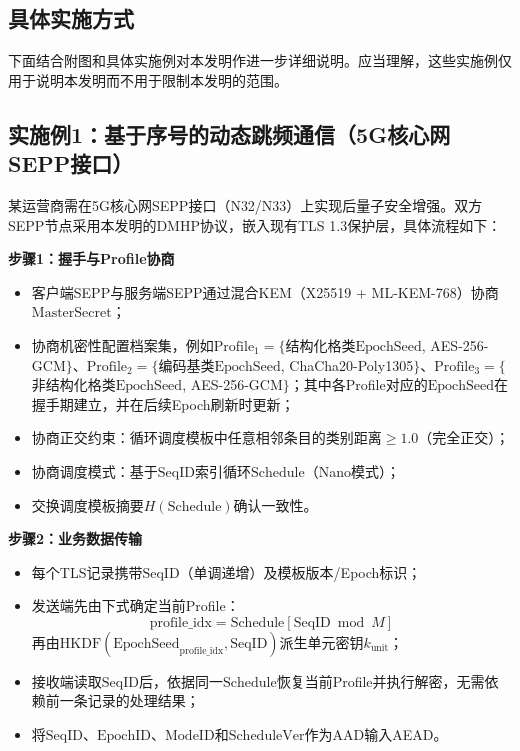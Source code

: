 ﻿\documentclass[12pt,a4paper]{article}
\begin{document}
\subsection*{具体实施方式}

下面结合附图和具体实施例对本发明作进一步详细说明。应当理解，这些实施例仅用于说明本发明而不用于限制本发明的范围。

\subsection*{实施例1：基于序号的动态跳频通信（5G核心网SEPP接口）}

某运营商需在5G核心网SEPP接口（N32/N33）上实现后量子安全增强。双方SEPP节点采用本发明的DMHP协议，嵌入现有TLS 1.3保护层，具体流程如下：

\textbf{步骤1：握手与Profile协商}

\begin{itemize}
    \item 客户端SEPP与服务端SEPP通过混合KEM（X25519 + ML-KEM-768）协商$\text{MasterSecret}$；
    \item 协商机密性配置档案集，例如$\text{Profile}_1=\{$结构化格类$\text{EpochSeed}$, AES-256-GCM$\}$、$\text{Profile}_2=\{$编码基类$\text{EpochSeed}$, ChaCha20-Poly1305$\}$、$\text{Profile}_3=\{$非结构化格类$\text{EpochSeed}$, AES-256-GCM$\}$；其中各Profile对应的$\text{EpochSeed}$在握手期建立，并在后续Epoch刷新时更新；
    \item 协商正交约束：循环调度模板中任意相邻条目的类别距离$\geq 1.0$（完全正交）；
    \item 协商调度模式：基于$\text{SeqID}$索引循环$\text{Schedule}$（Nano模式）；
    \item 交换调度模板摘要$H(\text{Schedule})$确认一致性。
\end{itemize}

\textbf{步骤2：业务数据传输}

\begin{itemize}
    \item 每个TLS记录携带$\text{SeqID}$（单调递增）及模板版本/Epoch标识；
    \item 发送端先由下式确定当前Profile：
    \[
    \text{profile\_idx}=\text{Schedule}[\text{SeqID} \bmod M]
    \]
    再由$\text{HKDF}(\text{EpochSeed}_{\text{profile\_idx}}, \text{SeqID})$派生单元密钥$k_{\text{unit}}$；
    \item 接收端读取$\text{SeqID}$后，依据同一$\text{Schedule}$恢复当前Profile并执行解密，无需依赖前一条记录的处理结果；
    \item 将$\text{SeqID}$、$\text{EpochID}$、$\text{ModeID}$和$\text{ScheduleVer}$作为AAD输入AEAD。
\end{itemize}
\end{document}
